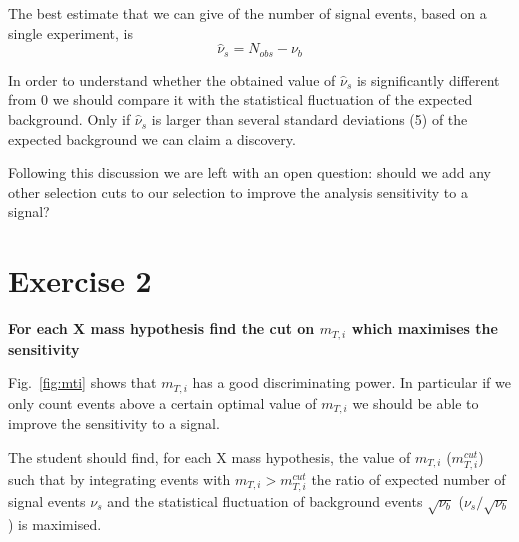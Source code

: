 \documentclass[a4paper,12pt]{article}
\begin{document}
The best estimate that we can give of the number of signal events, based on a
single experiment, is
\begin{equation}
\hat{\nu}_s=N_{obs}-\nu_b
\label{eq:nuhat}
\end{equation}

In order to understand whether the obtained value of $\hat{\nu}_s$ is
significantly different from 0 we should compare it with the statistical
fluctuation of the expected background. Only if $\hat{\nu}_s$ is larger
than several standard deviations (5) of the expected background we can claim a
discovery.

Following this discussion we are left with an open question: should we add any
other selection cuts to our selection to improve the analysis sensitivity to a
signal?

\section*{Exercise 2}
{\bf For each X mass hypothesis find the cut on $m_{T,i}$ which maximises the
sensitivity}

Fig.~\ref{fig:mti} shows that $m_{T,i}$ has a good discriminating power. In
particular if we only count events above a certain optimal value of  $m_{T,i}$ we
should be able to improve the sensitivity to a signal. 

The student should find, for each X mass hypothesis, the value of $m_{T,i}$
($m_{T,i}^{cut}$) such that by integrating events with
$m_{T,i}>m_{T,i}^{cut}$ the ratio of expected number of signal events
$\nu_s$ and the statistical fluctuation of background events
$\sqrt{\nu_b}$ ($\nu_s/\sqrt{\nu_b}$) is maximised.
\end{document}
